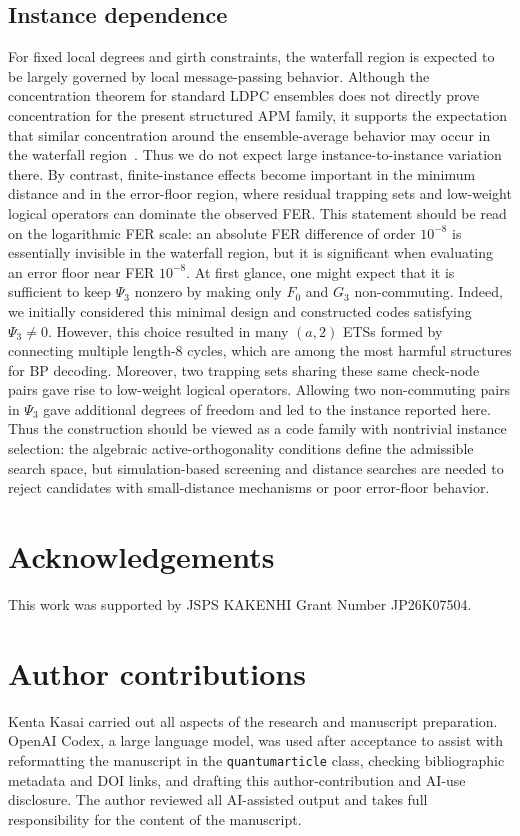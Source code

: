 \documentclass[a4paper,onecolumn,11pt,accepted=2026-08-03]{quantumarticle}
\renewcommand\[{\begin{equation}}
\renewcommand\]{\end{equation}}
\theoremstyle{definition}
\begin{document}
\subsection{Instance dependence}
{For fixed local degrees and girth constraints, the waterfall region is expected to be largely governed by local message-passing behavior.
Although the concentration theorem for standard LDPC ensembles does not directly prove concentration for the present structured APM family, it supports the expectation that similar concentration around the ensemble-average behavior may occur in the waterfall region~\cite{RichardsonUrbanke2001}.
Thus we do not expect large instance-to-instance variation there.
By contrast, finite-instance effects become important in the minimum distance and in the error-floor region, where residual trapping sets and low-weight logical operators can dominate the observed FER.
This statement should be read on the logarithmic FER scale: an absolute FER difference of order \(10^{-8}\) is essentially invisible in the waterfall region, but it is significant when evaluating an error floor near FER \(10^{-8}\).
At first glance, one might expect that it is sufficient to keep $\Psi_3$ nonzero by making only $F_0$ and $G_3$ non-commuting.
Indeed, we initially considered this minimal design and constructed codes satisfying $\Psi_3\neq0$.
However, this choice resulted in many $(a,2)$ ETSs formed by connecting multiple length-8 cycles, which are among the most harmful structures for BP decoding.
Moreover, two trapping sets sharing these same check-node pairs gave rise to low-weight logical operators.
Allowing two non-commuting pairs in $\Psi_3$ gave additional degrees of freedom and led to the instance reported here.
Thus the construction should be viewed as a code family with nontrivial instance selection: the algebraic active-orthogonality conditions define the admissible search space, but simulation-based screening and distance searches are needed to reject candidates with small-distance mechanisms or poor error-floor behavior.}
  

\section*{Acknowledgements}
This work was supported by JSPS KAKENHI Grant Number JP26K07504.

\section*{Author contributions}
Kenta Kasai carried out all aspects of the research and manuscript preparation.
OpenAI Codex, a large language model, was used after acceptance to assist with reformatting the manuscript in the \texttt{quantumarticle} class, checking bibliographic metadata and DOI links, and drafting this author-contribution and AI-use disclosure. The author reviewed all AI-assisted output and takes full responsibility for the content of the manuscript.
\end{document}
